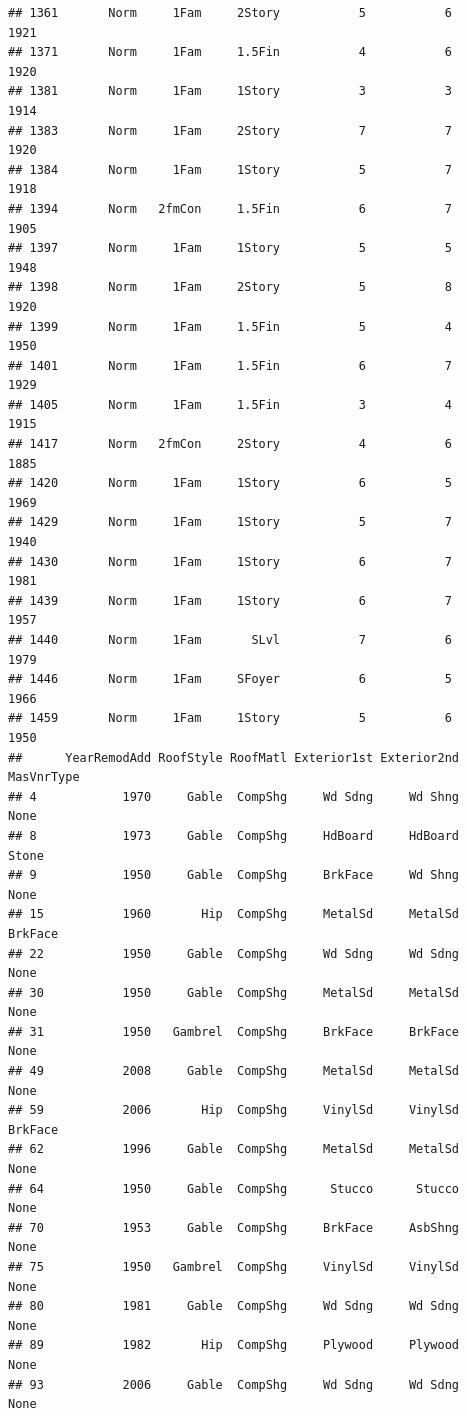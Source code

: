 \documentclass[]{article}
\begin{document}
\begin{verbatim}
## 1361       Norm     1Fam     2Story           5           6      1921
## 1371       Norm     1Fam     1.5Fin           4           6      1920
## 1381       Norm     1Fam     1Story           3           3      1914
## 1383       Norm     1Fam     2Story           7           7      1920
## 1384       Norm     1Fam     1Story           5           7      1918
## 1394       Norm   2fmCon     1.5Fin           6           7      1905
## 1397       Norm     1Fam     1Story           5           5      1948
## 1398       Norm     1Fam     2Story           5           8      1920
## 1399       Norm     1Fam     1.5Fin           5           4      1950
## 1401       Norm     1Fam     1.5Fin           6           7      1929
## 1405       Norm     1Fam     1.5Fin           3           4      1915
## 1417       Norm   2fmCon     2Story           4           6      1885
## 1420       Norm     1Fam     1Story           6           5      1969
## 1429       Norm     1Fam     1Story           5           7      1940
## 1430       Norm     1Fam     1Story           6           7      1981
## 1439       Norm     1Fam     1Story           6           7      1957
## 1440       Norm     1Fam       SLvl           7           6      1979
## 1446       Norm     1Fam     SFoyer           6           5      1966
## 1459       Norm     1Fam     1Story           5           6      1950
##      YearRemodAdd RoofStyle RoofMatl Exterior1st Exterior2nd MasVnrType
## 4            1970     Gable  CompShg     Wd Sdng     Wd Shng       None
## 8            1973     Gable  CompShg     HdBoard     HdBoard      Stone
## 9            1950     Gable  CompShg     BrkFace     Wd Shng       None
## 15           1960       Hip  CompShg     MetalSd     MetalSd    BrkFace
## 22           1950     Gable  CompShg     Wd Sdng     Wd Sdng       None
## 30           1950     Gable  CompShg     MetalSd     MetalSd       None
## 31           1950   Gambrel  CompShg     BrkFace     BrkFace       None
## 49           2008     Gable  CompShg     MetalSd     MetalSd       None
## 59           2006       Hip  CompShg     VinylSd     VinylSd    BrkFace
## 62           1996     Gable  CompShg     MetalSd     MetalSd       None
## 64           1950     Gable  CompShg      Stucco      Stucco       None
## 70           1953     Gable  CompShg     BrkFace     AsbShng       None
## 75           1950   Gambrel  CompShg     VinylSd     VinylSd       None
## 80           1981     Gable  CompShg     Wd Sdng     Wd Sdng       None
## 89           1982       Hip  CompShg     Plywood     Plywood       None
## 93           2006     Gable  CompShg     Wd Sdng     Wd Sdng       None

\end{verbatim}
\end{document}
